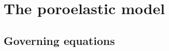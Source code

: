 
\section {The poroelastic model}
\label{sec:model}



\subsection{Governing equations}
\label{sec:nondimensional}

